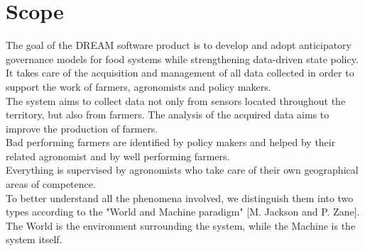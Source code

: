 \section{Scope}

The goal of the DREAM software product is to develop and adopt anticipatory governance models for food systems while strengthening data-driven state policy.\\
It takes care of the acquisition and management of all data collected in order to support the work of farmers, agronomists and policy makers.\\
The system aims to collect data not only from sensors located throughout the territory, but also from farmers. The analysis of the acquired data aims to improve the production of farmers.\\ Bad performing farmers are identified by policy makers and helped by their related agronomist and by well performing farmers.\\
Everything is supervised by agronomists who take care of their own geographical areas of competence.\\

To better understand all the phenomena involved, we distinguish them into two types according to the "World and Machine paradigm" [M. Jackson and P. Zane]. The World is the environment surrounding the system, while the Machine is the system itself.


